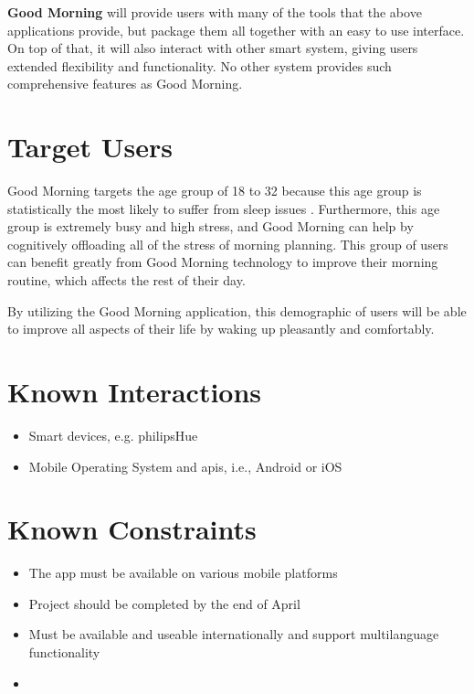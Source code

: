 \documentclass[11pt]{article}
\begin{document}
\textbf{Good Morning} will provide users with many of the tools that the above applications
provide, but package them all together with an easy to use interface. On top of that, it will also
interact with other smart system, giving users extended flexibility and functionality.
No other system provides such comprehensive features as Good Morning.

\section{Target Users}\label{target-users}

Good Morning targets the age group of 18 to 32 because this age group is statistically the most likely to suffer from sleep issues \cite{sleepdisorders}. Furthermore, this age group is extremely busy and high stress, and Good Morning can help by cognitively offloading all of the stress of morning planning. This group of users can benefit greatly from Good Morning technology to improve their morning routine, which affects the rest of their day.

By utilizing the Good Morning application, this demographic of users will be able to improve all aspects of their life by waking up pleasantly and comfortably.

%
\section{Known Interactions}\label{known-interactions}

\begin{itemize}
\item
  Smart devices, e.g. \gls{philipsHue}
\item
  Mobile Operating System and \glspl{api}, i.e., Android or iOS
\end{itemize}


%
\section{Known Constraints}\label{known-constraints}

\begin{itemize}
 \item The app must be available on various mobile platforms
 \item Project should be completed by the end of April
 \item Must be available and useable internationally and support multilanguage functionality
 \item
\end{itemize}
\end{document}
